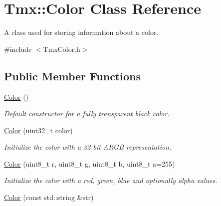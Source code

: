 \hypertarget{classTmx_1_1Color}{\section{Tmx\-:\-:Color Class Reference}
\label{classTmx_1_1Color}
}


A class used for storing information about a color.  




{\ttfamily \#include $<$Tmx\-Color.\-h$>$}

\subsection*{Public Member Functions}
\begin{DoxyCompactItemize}
\item 
\hypertarget{classTmx_1_1Color_ac462194348bb366f3b90d872d18486e2}{\hyperlink{classTmx_1_1Color_ac462194348bb366f3b90d872d18486e2}{Color} ()}\label{classTmx_1_1Color_ac462194348bb366f3b90d872d18486e2}

\begin{DoxyCompactList}\small\item\em Default constructor for a fully transparent black color. \end{DoxyCompactList}\item 
\hypertarget{classTmx_1_1Color_a29e71f2f41c56cbd07369f0d4c2e9531}{\hyperlink{classTmx_1_1Color_a29e71f2f41c56cbd07369f0d4c2e9531}{Color} (uint32\-\_\-t color)}\label{classTmx_1_1Color_a29e71f2f41c56cbd07369f0d4c2e9531}

\begin{DoxyCompactList}\small\item\em Initialize the color with a 32 bit A\-R\-G\-B representation. \end{DoxyCompactList}\item 
\hypertarget{classTmx_1_1Color_ac2bfcd16e5a09544dc78de7e0bdda14e}{\hyperlink{classTmx_1_1Color_ac2bfcd16e5a09544dc78de7e0bdda14e}{Color} (uint8\-\_\-t r, uint8\-\_\-t g, uint8\-\_\-t b, uint8\-\_\-t a=255)}\label{classTmx_1_1Color_ac2bfcd16e5a09544dc78de7e0bdda14e}

\begin{DoxyCompactList}\small\item\em Initialize the color with a red, green, blue and optionally alpha values. \end{DoxyCompactList}\item 
\hypertarget{classTmx_1_1Color_a46358ffd46a11af3a7d6a01aee9a4d08}{\hyperlink{classTmx_1_1Color_a46358ffd46a11af3a7d6a01aee9a4d08}{Color} (const std\-::string \&str)}\label{classTmx_1_1Color_a46358ffd46a11af3a7d6a01aee9a4d08}


\end{DoxyCompactItemize}
